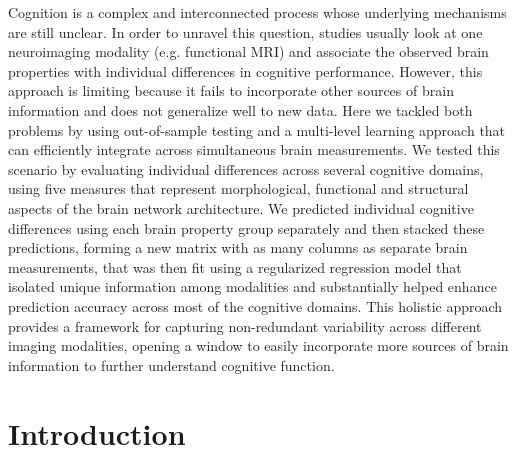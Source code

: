 \documentclass[10pt,letterpaper]{article}
\begin{document}
Cognition is a complex and interconnected process whose underlying mechanisms are still unclear. In order to unravel this question, studies usually look at one neuroimaging modality (e.g. functional MRI) and associate the observed brain properties with individual differences in cognitive performance. However, this approach is limiting because it fails to incorporate other sources of brain information and does not generalize well to new data. Here we tackled both problems by using out-of-sample testing and a multi-level learning approach that can efficiently integrate across simultaneous brain measurements. We tested this scenario by evaluating individual differences across several cognitive domains, using five measures that represent morphological, functional and structural aspects of the brain network architecture. We predicted individual cognitive differences using each brain property group separately and then stacked these predictions, forming a new matrix with as many columns as separate brain measurements, that was then fit using a regularized regression model that isolated unique information among modalities and substantially helped enhance prediction accuracy across most of the cognitive domains. This holistic approach provides a framework for capturing non-redundant variability across different imaging modalities, opening a window to easily incorporate more sources of brain information to further understand cognitive function.
\linenumbers


\section*{Introduction} \label{sec:intro}
\end{document}
